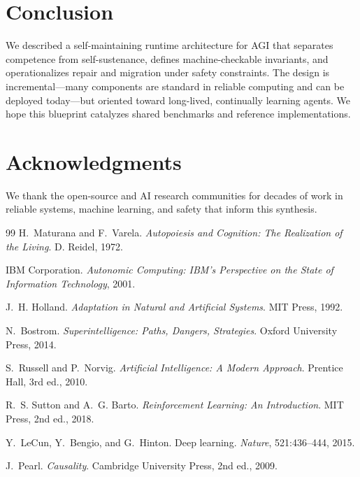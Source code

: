 \documentclass[12pt]{article}
\begin{document}
\section{Conclusion}
We described a self-maintaining runtime architecture for AGI that separates competence from self-sustenance, defines machine-checkable invariants, and operationalizes repair and migration under safety constraints. The design is incremental---many components are standard in reliable computing and can be deployed today---but oriented toward long-lived, continually learning agents. We hope this blueprint catalyzes shared benchmarks and reference implementations.

\section*{Acknowledgments}
We thank the open-source and AI research communities for decades of work in reliable systems, machine learning, and safety that inform this synthesis.

\begin{thebibliography}{99}
H.~Maturana and F.~Varela.
\newblock \emph{Autopoiesis and Cognition: The Realization of the Living}.
\newblock D. Reidel, 1972.

IBM Corporation.
\newblock \emph{Autonomic Computing: IBM's Perspective on the State of Information Technology}, 2001.

J.~H. Holland.
\newblock \emph{Adaptation in Natural and Artificial Systems}.
\newblock MIT Press, 1992.

N.~Bostrom.
\newblock \emph{Superintelligence: Paths, Dangers, Strategies}.
\newblock Oxford University Press, 2014.

S.~Russell and P.~Norvig.
\newblock \emph{Artificial Intelligence: A Modern Approach}.
\newblock Prentice Hall, 3rd ed., 2010.

R.~S. Sutton and A.~G. Barto.
\newblock \emph{Reinforcement Learning: An Introduction}.
\newblock MIT Press, 2nd ed., 2018.

Y.~LeCun, Y.~Bengio, and G.~Hinton.
\newblock Deep learning.
\newblock \emph{Nature}, 521:436--444, 2015.

J.~Pearl.
\newblock \emph{Causality}.
\newblock Cambridge University Press, 2nd ed., 2009.

\end{thebibliography}
\end{document}
